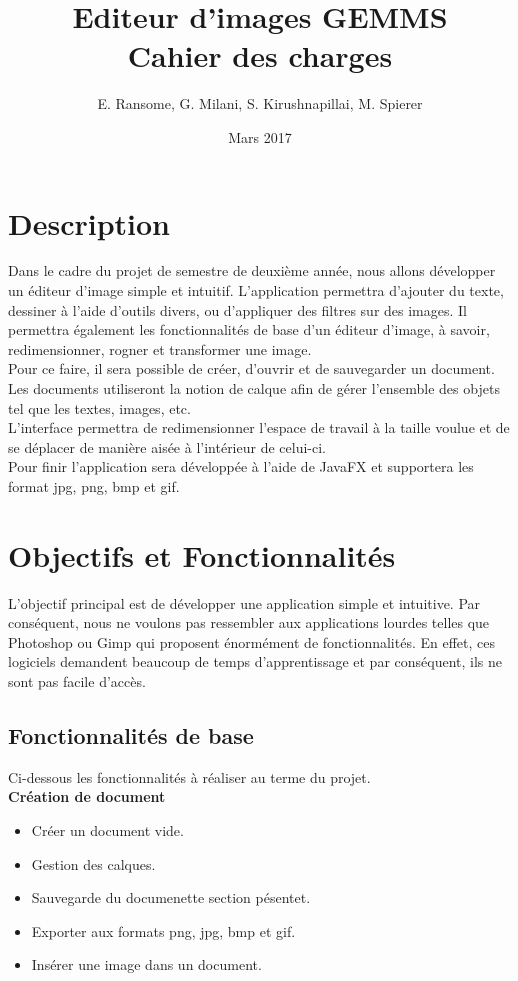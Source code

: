 \documentclass[11pt, a4paper, french]{article}
\title{Editeur d'images GEMMS \\ Cahier des charges}
\author{E. Ransome, G. Milani, S. Kirushnapillai, M. Spierer}
\date{Mars 2017}
\begin{document}
	\maketitle
	\thispagestyle{empty}
	\tableofcontents
	\pagebreak

	\section{Description}
		Dans le cadre du projet de semestre de deuxième année, nous allons développer un éditeur d'image simple et intuitif. L'application permettra d'ajouter du texte, dessiner à l'aide d'outils divers, ou d'appliquer des filtres sur des images. Il permettra également les fonctionnalités de base d'un éditeur d'image, à savoir, redimensionner, rogner et transformer une image. \\

		Pour ce faire, il sera possible de créer, d'ouvrir et de sauvegarder un document. Les documents utiliseront la notion de calque afin de gérer l'ensemble des objets tel que les textes, images, etc. \\

		L’interface permettra de redimensionner l’espace de travail à la taille voulue et de se déplacer de manière aisée à l’intérieur de celui-ci. \\

		Pour finir l’application sera développée à l’aide de JavaFX et supportera les format jpg, png, bmp et gif.

	\section{Objectifs et Fonctionnalités}

		L'objectif principal est de développer une application simple et intuitive. Par conséquent, nous ne voulons pas ressembler aux applications lourdes telles que Photoshop ou Gimp qui proposent énormément de fonctionnalités. En effet, ces logiciels demandent beaucoup de temps d'apprentissage et par conséquent, ils ne sont pas facile d'accès.

		\subsection{Fonctionnalités de base}

			Ci-dessous les fonctionnalités à réaliser au terme du projet.\\

			\textbf{Création de document}
			\begin{itemize}[label=\textbullet]
				\item Créer un document vide.
				\item Gestion des calques.
				\item Sauvegarde du documenette section pésentet.
				\item Exporter aux formats png, jpg, bmp et gif.
				\item Insérer une image dans un document. \\
			\end{itemize}
\end{document}
